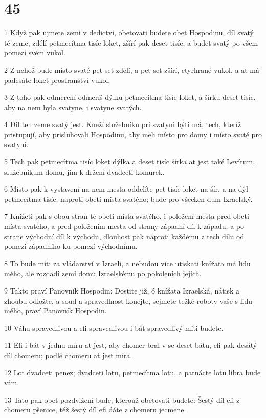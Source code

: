 \chapter{45}

\par 1 Když pak ujmete zemi v dedictví, obetovati budete obet Hospodinu, díl svatý té zeme, zdélí petmecítma tisíc loket, zšírí pak deset tisíc, a budet svatý po všem pomezí svém vukol.
\par 2 Z nehož bude místo svaté pet set zdélí, a pet set zšírí, ctyrhrané vukol, a at má padesáte loket prostranství vukol.
\par 3 Z toho pak odmerení odmeríš dýlku petmecítma tisíc loket, a šírku deset tisíc, aby na nem byla svatyne, i svatyne svatých.
\par 4 Díl ten zeme svatý jest. Kneží služebníku pri svatyni býti má, tech, kteríž pristupují, aby prisluhovali Hospodinu, aby meli místo pro domy i místo svaté pro svatyni.
\par 5 Tech pak petmecítma tisíc loket dýlka a deset tisíc šírka at jest také Levítum, služebníkum domu, jim k držení dvadceti komurek.
\par 6 Místo pak k vystavení na nem mesta oddelíte pet tisíc loket na šír, a na dýl petmecítma tisíc, naproti obeti místa svatého; bude pro všecken dum Izraelský.
\par 7 Knížeti pak s obou stran té obeti místa svatého, i položení mesta pred obeti místa svatého, a pred položením mesta od strany západní díl k západu, a po strane východní díl k východu, dlouhost pak naproti každému z tech dílu od pomezí západního ku pomezí východnímu.
\par 8 To bude míti za vládarství v Izraeli, a nebudou více utiskati knížata má lidu mého, ale rozdadí zemi domu Izraelskému po pokoleních jejich.
\par 9 Takto praví Panovník Hospodin: Dostite již, ó knížata Izraelská, nátisk a zhoubu odložte, a soud a spravedlnost konejte, sejmete težké roboty vaše s lidu mého, praví Panovník Hospodin.
\par 10 Váhu spravedlivou a efi spravedlivou i bát spravedlivý míti budete.
\par 11 Efi i bát v jednu míru at jest, aby chomer bral v se deset bátu, efi pak desátý díl chomeru; podlé chomeru at jest míra.
\par 12 Lot dvadceti penez; dvadceti lotu, petmecítma lotu, a patnácte lotu libra bude vám.
\par 13 Tato pak obet pozdvižení bude, kterouž obetovati budete: Šestý díl efi z chomeru pšenice, též šestý díl efi dáte z chomeru jecmene.

